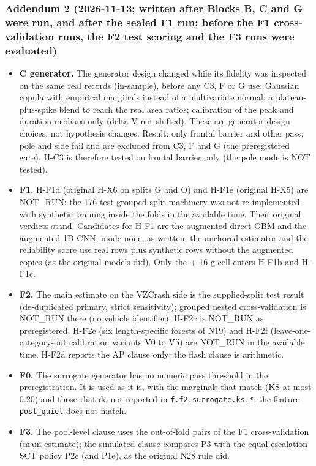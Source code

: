 \subsubsection*{Addendum 2 (2026-11-13; written after Blocks B, C and G were run, and after the sealed F1 run; before the F1 cross-validation runs, the F2 test scoring and the F3 runs were evaluated)}

\begin{itemize}
\item \textbf{C generator.} The generator design changed while its fidelity was inspected on the same real records (in-sample), before any C3, F or G use: Gaussian copula with empirical marginals instead of a multivariate normal; a plateau-plus-spike blend to reach the real area ratios; calibration of the peak and duration medians only (delta-V not shifted). These are generator design choices, not hypothesis changes. Result: only frontal barrier and other pass; pole and side fail and are excluded from C3, F and G (the preregistered gate). H-C3 is therefore tested on frontal barrier only (the pole mode is NOT tested).
\item \textbf{F1.} H-F1d (original H-X6 on splits G and O) and H-F1e (original H-X5) are NOT\_RUN: the 176-test grouped-split machinery was not re-implemented with synthetic training inside the folds in the available time. Their original verdicts stand. Candidates for H-F1 are the augmented direct GBM and the augmented 1D CNN, mode none, as written; the anchored estimator and the reliability score use real rows plus synthetic rows without the augmented copies (as the original models did). Only the +-16 g cell enters H-F1b and H-F1c.
\item \textbf{F2.} The main estimate on the VZCrash side is the supplied-split test result (de-duplicated primary, strict sensitivity); grouped nested cross-validation is NOT\_RUN there (no vehicle identifier). H-F2c is NOT\_RUN as preregistered. H-F2e (six length-specific forests of N19) and H-F2f (leave-one-category-out calibration variants V0 to V5) are NOT\_RUN in the available time. H-F2d reports the AP clause only; the flash clause is arithmetic.
\item \textbf{F0.} The surrogate generator has no numeric pass threshold in the preregistration. It is used as it is, with the marginals that match (KS at most 0.20) and those that do not reported in \texttt{f.f2.surrogate.ks.*}; the feature \texttt{post\_quiet} does not match.
\item \textbf{F3.} The pool-level clause uses the out-of-fold pairs of the F1 cross-validation (main estimate); the simulated clause compares P3 with the equal-escalation SCT policy P2e (and P1e), as the original N28 rule did.

\end{itemize}
